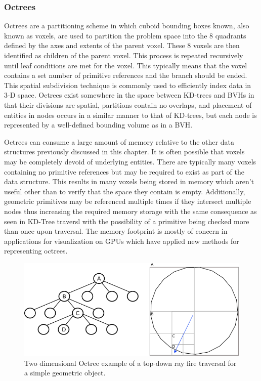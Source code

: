 \documentclass[12pt, a4paper]{article}
\begin{document}
\subsubsection{Octrees}%
\label{sec:octree}
Octrees are a partitioning scheme in which cuboid bounding boxes known, also known as voxels, are used to partition the problem space into the 8 quadrants defined by the axes and extents of the parent voxel. These 8 voxels are then identified as children of the parent voxel. This process is repeated recursively until leaf conditions are met for the voxel. This typically means that the voxel contains a set number of primitive references and the branch should be ended. This spatial subdivision technique is commonly used to efficiently index data in 3-D space.\cite{Glassner_1989} Octrees exist somewhere in the space between KD-trees and BVHs in that their divisions are spatial, partitions contain no overlaps, and placement of entities in nodes occurs in a similar manner to that of KD-trees, but each node is represented by a well-defined bounding volume as in a BVH.

Octrees can consume a large amount of memory relative to the other data structures previously discussed in this chapter. It is often possible that voxels may be completely devoid of underlying entities. There are typically many voxels containing no primitive references but may be required to exist as part of the data structure. This results in many voxels being stored in memory which aren't useful other than to verify that the space they contain is empty. Additionally, geometric primitives may be referenced multiple times if they intersect multiple nodes thus increasing the required memory storage with the same consequence as seen in KD-Tree traversl with the possibility of a primitive being checked more than once upon traversal. The memory footprint is mostly of concern in applications for visualization on GPUs which have applied new methods for representing octrees.

\begin{figure}[H]
  \centering
  \includegraphics[scale=0.65]{octree_2d_ex.png}
  \caption{Two dimensional Octree example of a top-down ray fire traversal for a simple geometric object.}
  \label{octree_2d_ex}
\end{figure}
\end{document}
